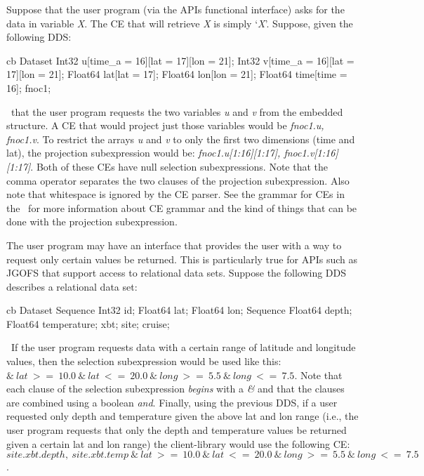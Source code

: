 Suppose that the user program (via the APIs functional interface) asks for
the data in variable {\em X\/}. The CE that will retrieve {\em X\/} is simply
`{\em X\/}'. Suppose, given the following DDS:

\begin{code}{cb}
Dataset {
    Int32 u[time_a = 16][lat = 17][lon = 21];
    Int32 v[time_a = 16][lat = 17][lon = 21];
    Float64 lat[lat = 17];
    Float64 lon[lon = 21];
    Float64 time[time = 16];
} fnoc1;
\end{code}

\noindent\ that the user program requests the two variables {\em u\/}
and {\em v\/} from the embedded structure. A CE that would project just those
variables would be {\em fnoc1.u, fnoc1.v\/}. To restrict the arrays {\em u\/}
and {\em v\/} to only the first two dimensions (time and lat), the projection
subexpression would be: {\em fnoc1.u[1:16][1:17], fnoc1.v[1:16][1:17]\/}.
Both of these CEs have null selection subexpressions. Note that the comma
operator separates the two clauses of the projection subexpression. Also note
that whitespace is ignored by the CE parser. See the grammar for CEs in the
\Dap\ for more information about CE grammar and the kind of things that can
be done with the projection subexpression.

The user program may have an interface that provides the user with a way to
request only certain values be returned. This is particularly true for APIs
such as JGOFS that support access to relational data sets. Suppose the
following DDS describes a relational data set:

\begin{code}{cb}
Dataset {
    Sequence {
        Int32 id;
        Float64 lat;
        Float64 lon;
        Sequence {
            Float64 depth;
            Float64 temperature;
        } xbt;
    } site;
} cruise;
\end{code}

\noindent\ If the user program requests data with a certain range of latitude
and longitude values, then the selection subexpression would be used like
this: $\&\ lat\ >=\ 10.0\ \&\ lat\ <=\ 20.0\ \&\ long\ >=\ 5.5\ \&\ long\ <=\
7.5$.
Note that each clause of the selection subexpression {\em begins\/} with a
{\em \&\/} and that the clauses are combined using a boolean {\em and}.
Finally, using the previous DDS, if a user requested only depth and
temperature given the above lat and lon range (i.e., the user program
requests that only the depth and temperature values be returned given a
certain lat and lon range) the client-library would use the following CE:
$site.xbt.depth,\ site.xbt.temp\ \&\ lat\ >=\ 10.0\ \&\ lat\ <=\ 20.0\ \&\
long\ >=\ 5.5\ \&\ long\ <=\ 7.5$.


